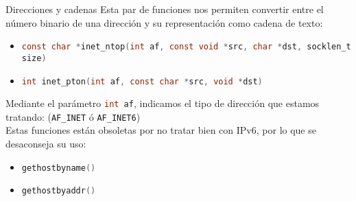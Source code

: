 \documentclass{mybeamer}
\begin{document}
\begin{framesec}{Direcciones y cadenas}
	Esta par de funciones nos permiten convertir entre el número binario de
	una dirección y su representación como cadena de texto:
	\vspace{1em}

	\begin{itemize}
		\item \lstinline[language=C]|const char *inet_ntop(int af, const void *src, char *dst, socklen_t size)|
		\item \lstinline[language=C]|int inet_pton(int af, const char *src, void *dst)|
	\end{itemize}

	Mediante el parámetro \lstinline[language=C]|int af|, indicamos el tipo
	de dirección que estamos tratando: (\lstinline[language=C]|AF_INET| ó
	\lstinline[language=C]|AF_INET6|)
	\\[1em]
	Estas funciones están obsoletas por no tratar bien con IPv6, por lo que
	se desaconseja su uso:
	\begin{itemize}
		\item \lstinline[language=C]|gethostbyname()|
		\item \lstinline[language=C]|gethostbyaddr()|
	\end{itemize}
\end{framesec}
\end{document}
